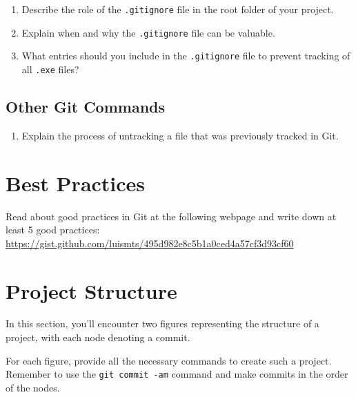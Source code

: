 \documentclass[titlepage]{article}
\newcommand{\code}{\texttt}
\begin{document}
\begin{enumerate}
    \item Describe the role of the \code{.gitignore} file in the root folder of your project.
    \item Explain when and why the \code{.gitignore} file can be valuable.
    \item What entries should you include in the \code{.gitignore} file to prevent tracking of all \code{.exe} files?
\end{enumerate}

\subsection{Other Git Commands}
\begin{enumerate}
    \item Explain the process of untracking a file that was previously tracked in Git.
\end{enumerate}

\section{Best Practices}
Read about good practices in Git at the following webpage and write down at least 5 good practices: \\ \url{https://gist.github.com/luismts/495d982e8c5b1a0ced4a57cf3d93cf60}

\pagebreak

\section{Project Structure}
In this section, you'll encounter two figures representing the structure of a project, with each node denoting a commit.

For each figure, provide all the necessary commands to create such a project. Remember to use the \code{git commit -am} command and make commits in the order of the nodes.
\end{document}
